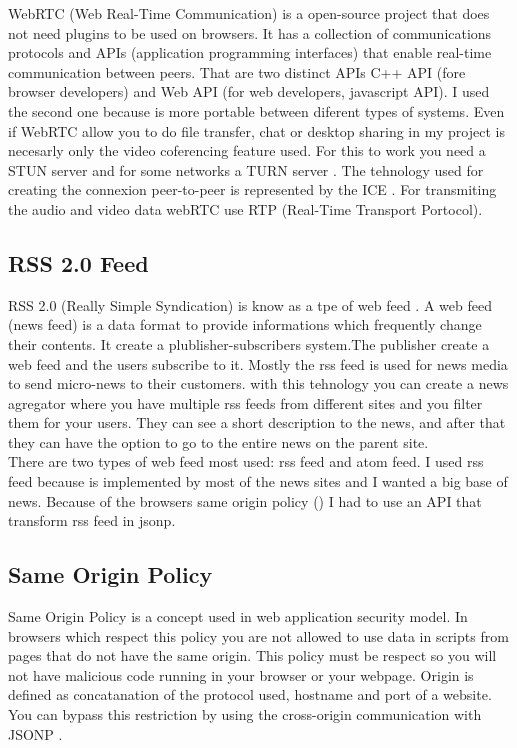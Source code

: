 WebRTC (Web Real-Time Communication) \cite{bergkvist2012webrtc} is a open-source project
that does not need plugins to be used on browsers. It has a collection of communications
protocols and APIs (application programming interfaces) that enable real-time
communication between peers.
That are two distinct APIs C++ API (fore browser developers) and Web API
(for web developers, javascript API).
I used the second one because is more portable
between diferent types of systems.
Even if WebRTC allow you to do file transfer, chat or desktop sharing 
in my project is necesarly only the video coferencing feature used.
For this to work you need a STUN server \cite{mahy2003network} and 
for some networks a TURN server \cite{mahy2010traversal}.
The tehnology used for creating the connexion peer-to-peer is represented
by the ICE \cite{rosenberg2010interactive}.
For transmiting the audio and video data webRTC use RTP (Real-Time Transport Portocol).


\subsection{RSS 2.0 Feed}
\label{sub-sec:tbkg-rss}
RSS 2.0 (Really Simple Syndication) \cite{board2014rss} is know as a tpe of web feed \cite{downing2008web}.
A web feed (news feed) is a data format to provide informations which frequently change their contents.
It create a plublisher-subscribers system.The publisher create a web feed and the users subscribe to it.
Mostly the rss feed is used for news media to send micro-news to their customers. with this tehnology you can
create a news agregator where you have multiple rss feeds from different sites and you filter them for your users.
They can see a short description to the news, and after that they can have the option to go to the entire news
on the parent site. \\
There are two types of web feed most used: rss feed and atom feed. I used rss feed because is implemented by most
of the news sites and I wanted a big base of news. Because of the browsers same origin policy ()
 I had to use an API that transform rss feed in jsonp.


\subsection{Same Origin Policy}
\label{sub-sec:tbkg-sameorigin}
Same Origin Policy \cite{network10same} is a concept used in web application security model. In browsers which respect this policy
you are not allowed to use data in scripts from pages that do not have the same origin. This policy must be respect so you will not have
malicious code running in your browser or your webpage. Origin is defined as concatanation of
the protocol used, hostname and port of a website. You can bypass this restriction by using the cross-origin communication
with JSONP \cite{ozses2009cross}.

